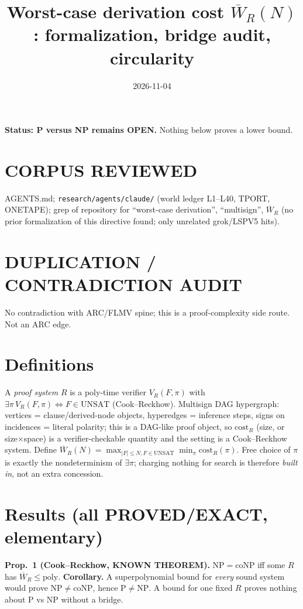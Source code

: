 \documentclass{article}
\begin{document}
\title{Worst-case derivation cost $\overline W_R(N)$: formalization, bridge audit, circularity}
\date{2026-11-04}\maketitle
\noindent\textbf{Status: P versus NP remains OPEN.} Nothing below proves a lower bound.

\section*{CORPUS REVIEWED}
AGENTS.md; \texttt{research/agents/claude/} (world ledger L1--L40, TPORT, ONETAPE); grep of repository for
``worst-case derivation'', ``multisign'', $\overline W_R$ (no prior formalization of this directive found; only unrelated grok/LSPV5 hits).
\section*{DUPLICATION / CONTRADICTION AUDIT}
No contradiction with ARC/FLMV spine; this is a proof-complexity side route. Not an ARC edge.

\section{Definitions}
A \emph{proof system} $R$ is a poly-time verifier $V_R(F,\pi)$ with $\exists\pi\,V_R(F,\pi)\iff F\in\mathrm{UNSAT}$ (Cook--Reckhow). Multisign DAG hypergraph: vertices = clause/derived-node
objects, hyperedges = inference steps, signs on incidences = literal polarity; this is a DAG-like proof object, so $\mathrm{cost}_R$ (size, or size$\times$space) is a verifier-checkable quantity and the setting is a Cook--Reckhow system. Define
$\overline W_R(N)=\max_{|F|\le N,F\in\mathrm{UNSAT}}\min_\pi \mathrm{cost}_R(\pi)$. Free choice of $\pi$ is exactly the nondeterminism of $\exists\pi$; charging nothing for search is therefore \emph{built in}, not an extra concession.

\section{Results (all PROVED/EXACT, elementary)}
\textbf{Prop.\ 1 (Cook--Reckhow, KNOWN THEOREM).} $\mathrm{NP}=\mathrm{coNP}$ iff some $R$ has $\overline W_R\le\mathrm{poly}$.
\textbf{Corollary.} A superpolynomial bound for \emph{every} sound system would prove $\mathrm{NP}\ne\mathrm{coNP}$, hence $\mathrm P\ne\mathrm{NP}$. A bound for one fixed $R$ proves nothing about P vs NP without a bridge.
\end{document}
